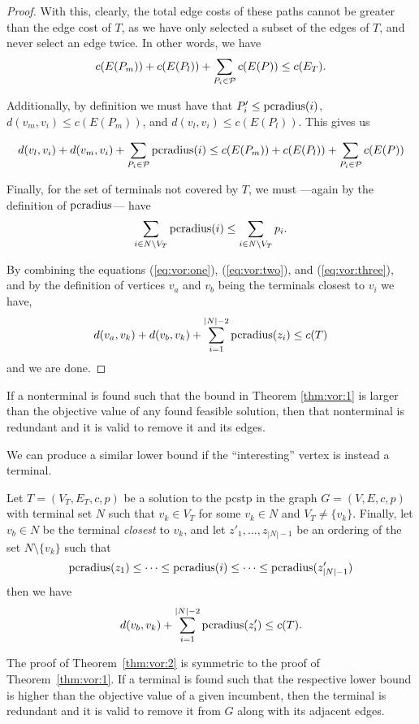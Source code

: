 \begin{proof}
With this, clearly, the total edge costs of these paths cannot be greater than the edge cost of $T$, as
we have only selected a subset of the edges of $T$, and never select an edge twice. In other words, we have
  \begin{equation}
    c(E(P_m)) + c(E(P_l)) + \sum_{P_i \in \mathcal{P}} c(E(P)) \leq c(E_T)\mathnormal{.}\label{eq:vor:one}
  \end{equation}

  
  Additionally, by definition
  we must have that $P_i' \leq \operatorname{pcradius}(i)$, $d(v_m, v_i) \leq c(E(P_m))$, and
  $d(v_l, v_i) \leq c(E(P_l))$. This gives us

  \begin{equation}
d(v_l, v_i) + d(v_m, v_i) + \sum_{P_i \in \mathcal{P}} \operatorname{pcradius}(i) \leq c(E(P_m)) + c(E(P_l)) + \sum_{P_i \in \mathcal{P}} c(E(P))\label{eq:vor:two}
\end{equation}

  Finally, for the set of terminals not covered by $T$, we must ---again by the definition of $\operatorname{pcradius}$--- have
  \begin{equation}
  \sum_{i \in N \setminus V_T} \operatorname{pcradius}(i) \leq \sum_{i \in N \setminus V_T} p_i \mathnormal{.}\label{eq:vor:three}
  \end{equation}

  By combining the equations (\ref{eq:vor:one}), (\ref{eq:vor:two}), and (\ref{eq:vor:three}), and
   by the definition of vertices $v_a$ and $v_b$ being the terminals closest to $v_i$ we have,
   \[d(v_a, v_k) + d(v_b, v_k) + \sum_{i = 1}^{|N| - 2} \operatorname{pcradius}(z_i) \leq c(T)\]
   and we are done.
 \end{proof}
 If a nonterminal is found such that the bound in Theorem \ref{thm:vor:1} is larger than the objective value of
 any found feasible solution, then that nonterminal is redundant and it is valid to remove it and its edges.

 We can produce a similar lower bound if the ``interesting'' vertex is instead a terminal.
\begin{theorem}\label{thm:vor:2}
  Let $T = (V_T, E_T, c, p)$ be a solution to the \gls{pcstp} in the graph $G = (V, E, c, p)$ with terminal set $N$ such that
  $v_k \in V_T$ for some $v_k \in N$ and $V_T \neq \{v_k\}$. Finally, let $v_b \in N$ be the terminal \textit{closest}
  to $v_k$, and let $z'_1, \ldots, z_{|N|-1}$ be an ordering of the set $N \setminus \{v_k\}$ such that
  \[\operatorname{pcradius}(z_1) \leq \cdots \leq \operatorname{pcradius}(i) \leq \cdots \leq \operatorname{pcradius}(z'_{|N|-1})\]
  then we have
  \[d(v_b, v_k) + \sum_{i = 1}^{|N| - 2} \operatorname{pcradius}(z'_i) \leq c(T)\mathnormal{.}\]
\end{theorem}
The proof of Theorem~\ref{thm:vor:2} is symmetric to the proof of Theorem~\ref{thm:vor:1}. If a terminal is found such that
the respective lower bound is higher than the objective value of a given incumbent, then the terminal is redundant and it is
 valid to remove it from $G$ along with its adjacent edges.


